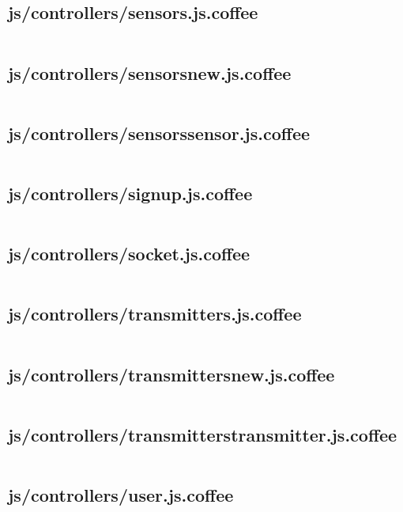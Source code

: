 \documentclass[letterpaper, 12 pt]{article}
\begin{document}
\subsection{js/controllers/sensors.js.coffee}
\inputminted{ruby}{../app/assets/javascripts/controllers/sensors.js.coffee}
\subsection{js/controllers/sensors\textunderscore new.js.coffee}
\inputminted{ruby}{../app/assets/javascripts/controllers/sensors_new.js.coffee}
\subsection{js/controllers/sensors\textunderscore sensor.js.coffee}
\inputminted{ruby}{../app/assets/javascripts/controllers/sensors_sensor.js.coffee}
\subsection{js/controllers/signup.js.coffee}
\inputminted{ruby}{../app/assets/javascripts/controllers/signup.js.coffee}
\subsection{js/controllers/socket.js.coffee}
\inputminted{ruby}{../app/assets/javascripts/controllers/socket.js.coffee}
\subsection{js/controllers/transmitters.js.coffee}
\inputminted{ruby}{../app/assets/javascripts/controllers/transmitters.js.coffee}
\subsection{js/controllers/transmitters\textunderscore new.js.coffee}
\inputminted{ruby}{../app/assets/javascripts/controllers/transmitters_new.js.coffee}
\subsection{js/controllers/transmitters\textunderscore transmitter.js.coffee}
\inputminted{ruby}{../app/assets/javascripts/controllers/transmitters_transmitter.js.coffee}
\subsection{js/controllers/user.js.coffee}
\inputminted{ruby}{../app/assets/javascripts/controllers/user.js.coffee}
\end{document}
